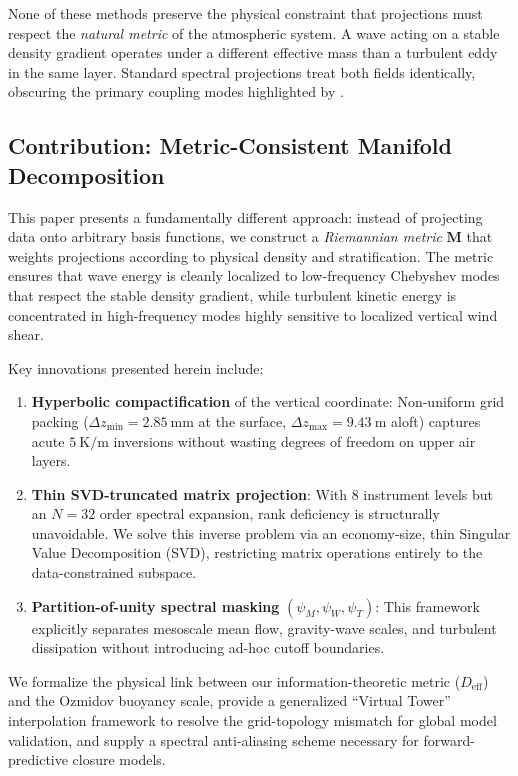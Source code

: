 \documentclass[11pt,a4paper]{article}
\begin{document}
None of these methods preserve the physical constraint that projections must respect the \emph{natural metric} of the atmospheric system. A wave acting on a stable density gradient operates under a different effective mass than a turbulent eddy in the same layer. Standard spectral projections treat both fields identically, obscuring the primary coupling modes highlighted by \citet{Sun2015}.

\subsection{Contribution: Metric-Consistent Manifold Decomposition}

This paper presents a fundamentally different approach: instead of projecting data onto arbitrary basis functions, we construct a \emph{Riemannian metric} $\mathbf{M}$ that weights projections according to physical density and stratification. The metric ensures that wave energy is cleanly localized to low-frequency Chebyshev modes that respect the stable density gradient, while turbulent kinetic energy is concentrated in high-frequency modes highly sensitive to localized vertical wind shear. 

Key innovations presented herein include:
\begin{enumerate}
    \item \textbf{Hyperbolic compactification} of the vertical coordinate: Non-uniform grid packing ($\Delta z_{\min} = \SI{2.85}{\milli\meter}$ at the surface, $\Delta z_{\max} = \SI{9.43}{\meter}$ aloft) captures acute $\SI{5}{\kelvin\per\meter}$ inversions without wasting degrees of freedom on upper air layers.
    \item \textbf{Thin SVD-truncated matrix projection}: With 8 instrument levels but an $N=32$ order spectral expansion, rank deficiency is structurally unavoidable. We solve this inverse problem via an economy-size, thin Singular Value Decomposition (SVD), restricting matrix operations entirely to the data-constrained subspace.
    \item \textbf{Partition-of-unity spectral masking} $(\psi_M, \psi_W, \psi_T)$: This framework explicitly separates mesoscale mean flow, gravity-wave scales, and turbulent dissipation without introducing ad-hoc cutoff boundaries.
\end{enumerate}

We formalize the physical link between our information-theoretic metric ($D_{\mathrm{eff}}$) and the Ozmidov buoyancy scale, provide a generalized ``Virtual Tower'' interpolation framework to resolve the grid-topology mismatch for global model validation, and supply a spectral anti-aliasing scheme necessary for forward-predictive closure models.
\end{document}
